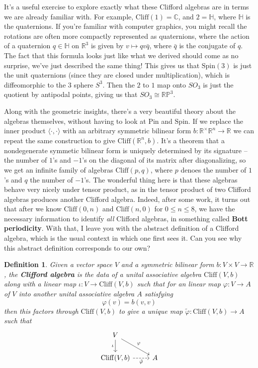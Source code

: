 \documentclass{article}
\newcommand{\C}{\mathbb{C}}
\newcommand{\R}{\mathbb{R}}
\newtheorem{definition}{Definition}[subsection]
\begin{document}
It's a useful exercise to explore exactly what these Clifford algebras are in terms we are already familiar with. For example, $\mathrm{Cliff}(1) = \C$, and $\mathrm{2} = \mathbb{H}$, where $\mathbb{H}$ is the quaternions. If you're familiar with computer graphics, you might recall the rotations are often more compactly represented as quaternions, where the action of a quaternion $q \in \mathbb{H}$ on $\R^3$ is given by $v \mapsto qv\bar{q}$, where $\bar{q}$ is the conjugate of $q$. The fact that this formula looks just like what we derived should come as no surprise, we've just described the same thing! This gives us that $\mathrm{Spin}(3)$ is just the unit quaternions (since they are closed under multiplication), which is diffeomorphic to the $3$ sphere $S^3$. Then the $2$ to $1$ map onto $SO_3$ is just the quotient by antipodal points, giving us that $SO_3 \cong \mathbb{RP}^3$.

Along with the geometric insights, there's a very beautiful theory about the algebras themselves, without having to look at $\mathrm{Pin}$ and $\mathrm{Spin}$. If we replace the inner product $\langle \cdot,\cdot \rangle$ with an arbitrary symmetric bilinear form $b : \R^ \times \R^n \to \R$ we can repeat the same construction to give $\mathrm{Cliff}(\R^n ,b)$. It's a theorem that a nondegenerate symmetic bilinear form is uniquely determined by its signature -- the number of $1$'s and $-1$'s on the diagonal of its matrix after diagonalizing, so we get an infinite family of algebras $\mathrm{Cliff}(p,q)$, where $p$ denoes the number of $1$'s and $q$ the number of $-1$'s. The wonderful thing here is that these algebras behave very nicely under tensor product, as in the tensor product of two Clifford algebras produces another Clifford algebra. Indeed, after some work, it turns out that after we know $\mathrm{Cliff}(0,n)$ and $\mathrm{Cliff}(n,0)$ for $0 \leq n \leq 8$, we have the necessary information to identify \emph{all} Clifford algebras, in something called \textbf{Bott periodicity}. With that, I leave you with the abstract definition of a Clifford algebra, which is the usual context in which one first sees it. Can you see why this abstract definition corresponds to our own?
\begin{definition}
Given a vector space $V$ and a symmetric bilinear form $b : V \times V \to \R$, the \textbf{Clifford algebra} is the data of a unital associative algebra $\mathrm{Cliff}(V,b)$ along with a linear map $\iota : V \to \mathrm{Cliff}(V,b)$ such that for an linear map $\varphi : V \to A$ of $V$ into another unital associative algebra $A$ satisfying 
$$\varphi(v) = b(v,v) $$
then this factors through $\mathrm{Cliff}(V,b)$ to give a unique map $\tilde{\varphi} : \mathrm{Cliff}(V,b) \to A$ such that 
$$\begin{tikzcd} 
V \ar[d, "\iota"'] \ar[dr, "\varphi"] \\
\mathrm{Cliff}(V,b) \ar[r, "\tilde{\varphi}"', dashed] & A
\end{tikzcd}$$
\end{definition}
%
\end{document}
